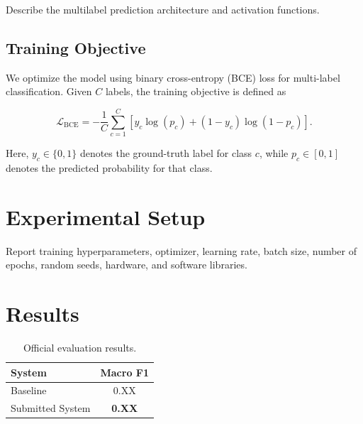 \documentclass[10pt,a4paper]{article}
\begin{document}
Describe the multilabel prediction architecture and
activation functions.



\subsection{Training Objective}

We optimize the model using binary cross-entropy (BCE)
loss for multi-label classification. Given $C$ labels,
the training objective is defined as

\begin{equation}
\mathcal{L}_{\mathrm{BCE}}
=
-\frac{1}{C}
\sum_{c=1}^{C}
\left[
y_c \log(p_c)
+
(1-y_c)\log(1-p_c)
\right].
\label{eq:bce}
\end{equation}

Here, $y_c \in \{0,1\}$ denotes the ground-truth label
for class $c$, while $p_c \in [0,1]$ denotes the predicted
probability for that class.



\section{Experimental Setup}

Report training hyperparameters, optimizer, learning rate,
batch size, number of epochs, random seeds, hardware, and
software libraries.



\section{Results}

\begin{table}[t]

\centering

\small

\begin{tabular}{lc}

\toprule

System & Macro F1 \\

\midrule

Baseline & 0.XX \\

Submitted System & \textbf{0.XX} \\

\bottomrule

\end{tabular}

\caption{
Official evaluation results.
}

\label{tab:results}

\end{table}
\end{document}
